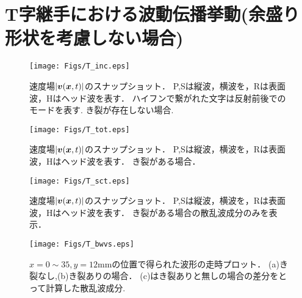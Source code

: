 \section{T字継手における波動伝播挙動(余盛り形状を考慮しない場合)}
\begin{figure}[h]
	\begin{center}
	\texttt{[image: Figs/T\_inc.eps]} 
	\end{center}
	\caption{
		速度場$|\mbox{\boldmath $v$}(\mbox{\boldmath $x$},t)|$のスナップショット．
		P,Sは縦波，横波を，Rは表面波，Hはヘッド波を表す．
		ハイフンで繋がれた文字は反射前後でのモードを表す. き裂が存在しない場合.
	} 
	\label{fig:fig3_5}
\end{figure}
\begin{figure}[h]
	\begin{center}
	\texttt{[image: Figs/T\_tot.eps]} 
	\end{center}
	\caption{
		速度場$|\mbox{\boldmath $v$}(\mbox{\boldmath $x$},t)|$のスナップショット．
		P,Sは縦波，横波を，Rは表面波，Hはヘッド波を表す．
		き裂がある場合．
	} 
	\label{fig:fig3_6}
\end{figure}
\begin{figure}[h]
	\begin{center}
	\texttt{[image: Figs/T\_sct.eps]} 
	\end{center}
	\caption{
		速度場$|\mbox{\boldmath $v$}(\mbox{\boldmath $x$},t)|$のスナップショット．
		P,Sは縦波，横波を，Rは表面波，Hはヘッド波を表す．
		き裂がある場合の散乱波成分のみを表示．
	} 
	\label{fig:fig3_7}
\end{figure}
\begin{figure}[h]
	\begin{center}
	\texttt{[image: Figs/T\_bwvs.eps]} 
	\end{center}
	\caption{
		$x=0\sim35, y=12$mmの位置で得られた波形の走時プロット．
		(a)き裂なし,(b)き裂ありの場合．
		(c)はき裂ありと無しの場合の差分をとって計算した散乱波成分.
	} 
	\label{fig:fig3_8}
\end{figure}


